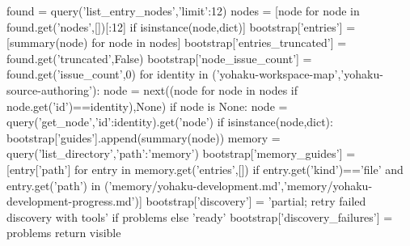         found = query('list_entry_nodes',{'limit':12})
        nodes = [node for node in found.get('nodes',[])[:12] if isinstance(node,dict)]
        bootstrap['entries'] = [summary(node) for node in nodes]
        bootstrap['entries_truncated'] = found.get('truncated',False)
        bootstrap['node_issue_count'] = found.get('issue_count',0)
        for identity in ('yohaku-workspace-map','yohaku-source-authoring'):
            node = next((node for node in nodes if node.get('id')==identity),None)
            if node is None:
                node = query('get_node',{'id':identity}).get('node')
            if isinstance(node,dict):
                bootstrap['guides'].append(summary(node))
        memory = query('list_directory',{'path':'memory'})
        bootstrap['memory_guides'] = [entry['path'] for entry in memory.get('entries',[])
                                      if entry.get('kind')=='file' and entry.get('path') in
                                      ('memory/yohaku-development.md','memory/yohaku-development-progress.md')]
        bootstrap['discovery'] = 'partial; retry failed discovery with tools' if problems else 'ready'
        bootstrap['discovery_failures'] = problems
        return visible


